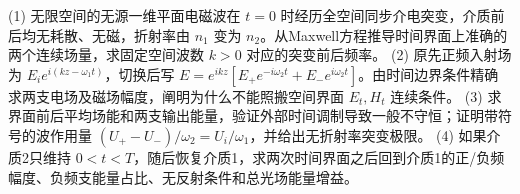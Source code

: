 (1) 无限空间的无源一维平面电磁波在 \(t=0\) 时经历全空间同步介电突变，介质前后均无耗散、无磁，折射率由 \(n_1\) 变为 \(n_2\)。从Maxwell方程推导时间界面上准确的两个连续场量，求固定空间波数 \(k>0\) 对应的突变前后频率。
(2) 原先正频入射场为 \(E_ie^{i(kz-\omega_1t)}\)，切换后写
\(E=e^{ikz}[E_+e^{-i\omega_2t}+E_-e^{i\omega_2t}]\)。由时间边界条件精确求两支电场及磁场幅度，阐明为什么不能照搬空间界面 \(E_t,H_t\) 连续条件。
(3) 求界面前后平均场能和两支输出能量，验证外部时间调制导致一般不守恒；证明带符号的波作用量
\((U_+-U_-)/\omega_2=U_i/\omega_1\)，并给出无折射率突变极限。
(4) 如果介质2只维持 \(0<t<T\)，随后恢复介质1，求两次时间界面之后回到介质1的正/负频幅度、负频支能量占比、无反射条件和总光场能量增益。

